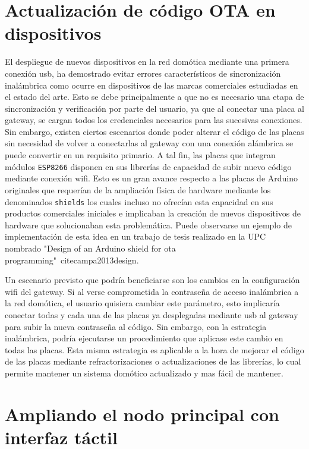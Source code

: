 \section{Actualización de código OTA en dispositivos}
\label{ch:Capitulo6.4}
El despliegue de nuevos dispositivos en la red domótica mediante una primera conexión \gls{usb}, ha demostrado evitar errores característicos de sincronización inalámbrica como ocurre en dispositivos de las marcas comerciales estudiadas en el estado del arte. Esto se debe principalmente a que no es necesario una etapa de sincronización y verificación por parte del usuario, ya que al conectar una placa al \gls{gateway}, se cargan todos los credenciales necesarios para las sucesivas conexiones. Sin embargo, existen ciertos escenarios donde poder alterar el código de las placas sin necesidad de volver a conectarlas al \gls{gateway} con una conexión alámbrica se puede convertir en un requisito primario. A tal fin, las placas que integran módulos \verb|ESP8266| disponen en sus librerías de capacidad de subir nuevo código mediante conexión \gls{wifi}. Esto es un gran avance respecto a las placas de Arduino originales que requerían de la ampliación física de hardware mediante los denominados \verb|shields| los cuales incluso no ofrecían esta capacidad en sus productos comerciales iniciales e implicaban la creación de nuevos dispositivos de hardware que solucionaban esta problemática. Puede observarse un ejemplo de implementación de esta idea en un trabajo de tesis realizado en la UPC nombrado "Design of an Arduino shield for ota programming"~cite{campa2013design}.

\vspace{1cm}

Un escenario previsto que podría beneficiarse son los cambios en la configuración \gls{wifi} del \gls{gateway}. Si al verse comprometida la contraseña de acceso inalámbrica a la red domótica, el usuario quisiera cambiar este parámetro, esto implicaría conectar todas y cada una de las placas ya desplegadas mediante \gls{usb} al \gls{gateway} para subir la nueva contraseña al código. Sin embargo, con la estrategia inalámbrica, podría ejecutarse un procedimiento que aplicase este cambio en todas las placas. Esta misma estrategia es aplicable a la hora de mejorar el código de las placas mediante refractorizaciones o actualizaciones de las librerías, lo cual permite mantener un sistema domótico actualizado y mas fácil de mantener.

\section{Ampliando el nodo principal con interfaz táctil}
\label{ch:Capitulo6.5}

